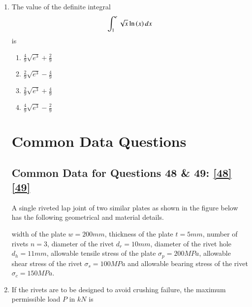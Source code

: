 \documentclass[journal]{IEEEtran}
\numberwithin{equation}{enumi}
\numberwithin{figure}{enumi}
\begin{document}
\begin{enumerate}
    \item 
    The value of the definite integral
    \begin{align*}
        \int_1^e \sqrt{x}\ln{\ensuremath{\left(x\right)}}\, dx
    \end{align*}
    is
    \hfill{}

    \begin{multicols}{4}
        \begin{enumerate}
            \item $\frac{4}{9}\sqrt{e^3} + \frac{2}{9}$
            \item $\frac{2}{9}\sqrt{e^3} - \frac{4}{9}$
            \item $\frac{2}{9}\sqrt{e^3} + \frac{4}{9}$
            \item $\frac{4}{9}\sqrt{e^3} - \frac{2}{9}$
        \end{enumerate}
    \end{multicols}

    \section{Common Data Questions}

    \subsection{Common Data for Questions 48 \& 49: \ref{48} \ref{49}}
   
    A single riveted lap joint of two similar plates as shown in the figure below has the following geometrical
    and material details.
    
    \begin{figure}[H]
    \centering
    \resizebox{0.8\textwidth}{!}{}
    \end{figure}

    width of the plate $w = 200 mm$, thickness of the plate $t = 5 mm$, number of rivets $n = 3$, diameter of the rivet $d_r = 10 mm$, diameter of the rivet hole $d_h = 11 mm$, allowable tensile stress of the plate $\sigma_p = 200 MPa$, allowable shear stress of the rivet $\sigma_s = 100 MPa$ and allowable bearing stress of the rivet $\sigma_c = 150 MPa$.\\

    \item 
    If the rivets are to be designed to avoid crushing failure, the maximum permissible load $P$ in $kN$ is \label{48}
    \hfill{}


\end{enumerate}
\end{document}
